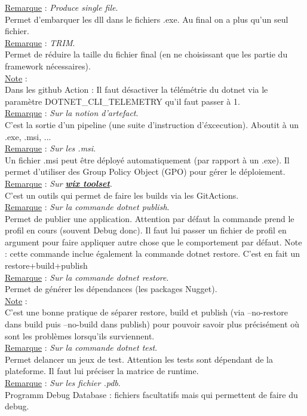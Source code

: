 \documentclass[a4paper,12pt,twoside]{article}
\newcommand{\urlcolor}{magenta}  %
\newcommand{\keycolor}{purple} %
\newcommand{\rem}[2]{\noindent\underline{Remarque} : \textit{#1}.\\ \indent #2}
\newcommand{\note}[1]{\noindent\underline{Note} : \\ \indent #1}
\newcommand{\keyref}[2]{\hypersetup{urlcolor=\keycolor} \href{#1}{\textbf{#2}}\hypersetup{urlcolor=\urlcolor}}
\begin{document}
\rem{Produce single file}{Permet d'embarquer les dll dans le fichiers .exe. Au final on a plus qu'un seul fichier.}\\

\rem{TRIM}{Permet de réduire la taille du fichier final (en ne choisissant que les partie du framework nécessaires).}\\

\note{Dans les github Action : Il faut désactiver la télémétrie du dotnet via le paramètre DOTNET_CLI_TELEMETRY qu'il faut passer à 1.}\\

\rem{Sur la notion d'artefact}{C'est la sortie d'un pipeline (une suite d'instruction d'éxcecution). Aboutit à un .exe, .msi, ...}\\

\rem{Sur les .msi}{Un fichier .msi peut être déployé automatiquement (par rapport à un .exe). Il permet d'utiliser des Group Policy Object (GPO) pour gérer le déploiement.}\\

\rem{Sur \keyref{https://wixtoolset.org/}{wix toolset}}{C'est un outils qui permet de faire les builds via les GitActions.}\\

\rem{Sur la commande dotnet publish}{Permet de publier une application. Attention par défaut la commande prend le profil en cours (souvent Debug donc). Il faut lui passer un fichier de profil en argument pour faire appliquer autre chose que le comportement par défaut. Note : cette commande inclue également la commande dotnet restore. C'est en fait un restore+build+publish}\\

\rem{Sur la commande dotnet restore}{Permet de générer les dépendances (les packages Nugget).}\\

\note{C'est une bonne pratique de séparer restore, build et publish (via --no-restore dans build puis --no-build dans publish) pour pouvoir savoir plus précisément où sont les problèmes lorsqu'ils surviennent.}\\

\rem{Sur la commande dotnet test}{Permet delancer un jeux de test. Attention les tests sont dépendant de la plateforme. Il faut lui préciser la matrice de runtime.}\\

\rem{Sur les fichier .pdb}{Programm Debug Database : fichiers facultatifs mais qui permettent de faire du debug.}\\
\end{document}
